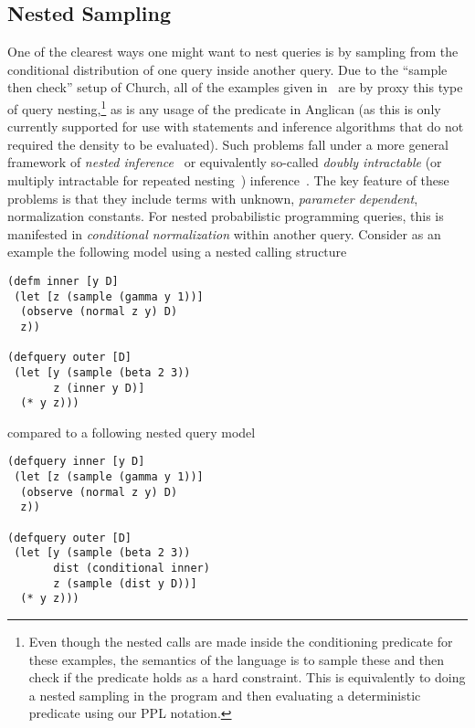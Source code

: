 \subsection{Nested Sampling}
\label{sec:design:imp:sampling}

One of the clearest ways one might want to nest queries is by sampling from the conditional
distribution of one query inside another query.  Due to the ``sample then check'' setup of
Church, all of the examples given in~\cite{stuhlmuller2014reasoning} are by proxy this
type of query nesting,\footnote{Even though the nested calls are made inside the conditioning
	predicate for these examples, the semantics of the language is to sample these
	and then check if the predicate holds as a hard constraint.  This is equivalently to doing a nested
	sampling in the program and then evaluating a deterministic predicate using our PPL notation.}
as is any usage of the \conditional predicate in Anglican (as this is only currently supported for use
with \sample statements and inference algorithms that do not required the density to be evaluated).
Such problems fall under a more general framework of \emph{nested inference}~\cite{mantadelis2011nesting} or equivalently so-called
\emph{doubly intractable} (or multiply intractable for repeated nesting~\citep{stuhlmuller2014reasoning}) 
inference~\citep{murray2006mcmc}.  The key feature of these problems is that they include
terms with unknown, \emph{parameter dependent}, normalization constants.  For nested probabilistic programming
queries, this is manifested in \emph{conditional normalization} within another query.
Consider as an example the following model using a nested calling structure
\vspace{-15pt}
\begin{lstlisting}[basicstyle=\ttfamily\footnotesize,multicols=2,frame=none]
(defm inner [y D]
 (let [z (sample (gamma y 1))]
  (observe (normal z y) D)
  z))

(defquery outer [D]
 (let [y (sample (beta 2 3))
       z (inner y D)]
  (* y z)))
\end{lstlisting}
\vspace{-25pt}
compared to a following nested query model
\vspace{-15pt}
\begin{lstlisting}[basicstyle=\ttfamily\footnotesize,multicols=2,frame=none]
(defquery inner [y D]
 (let [z (sample (gamma y 1))]
  (observe (normal z y) D)
  z))
  
(defquery outer [D]
 (let [y (sample (beta 2 3))
       dist (conditional inner)
       z (sample (dist y D))]
  (* y z)))
\end{lstlisting}
